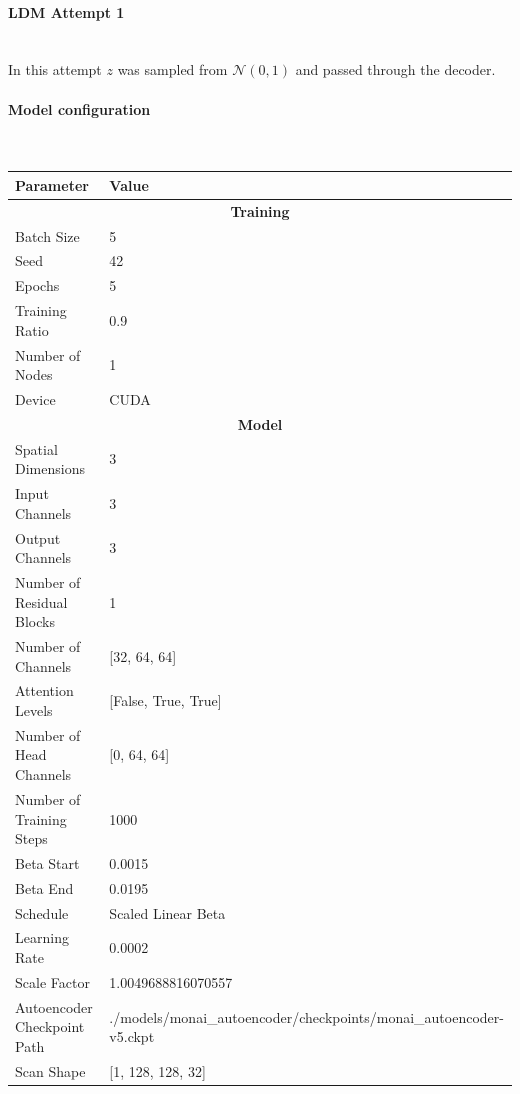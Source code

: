 \paragraph{LDM Attempt 1}\mbox{}\\

In this attempt $z$ was sampled from $\mathcal{N}(0,1)$ and passed through the decoder. 

\paragraph{Model configuration}\mbox{}\\
\begin{table}[H!]
\centering
\begin{tabular}{|l|l|}
\hline
\textbf{Parameter} & \textbf{Value} \\
\hline
\multicolumn{2}{|c|}{\textbf{Training}} \\
\hline
Batch Size & 5 \\
\hline
Seed & 42 \\
\hline
Epochs & 5 \\
\hline
Training Ratio & 0.9 \\
\hline
Number of Nodes & 1 \\
\hline
Device & CUDA \\
\hline
\multicolumn{2}{|c|}{\textbf{Model}} \\
\hline
Spatial Dimensions & 3 \\
\hline
Input Channels & 3 \\
\hline
Output Channels & 3 \\
\hline
Number of Residual Blocks & 1 \\
\hline
Number of Channels & [32, 64, 64] \\
\hline
Attention Levels & [False, True, True] \\
\hline
Number of Head Channels & [0, 64, 64] \\
\hline
Number of Training Steps & 1000 \\
\hline
Beta Start & 0.0015 \\
\hline
Beta End & 0.0195 \\
\hline
Schedule & Scaled Linear Beta \\
\hline
Learning Rate & 0.0002 \\
\hline
Scale Factor & 1.0049688816070557 \\
\hline
Autoencoder Checkpoint Path & ./models/monai_autoencoder/checkpoints/monai_autoencoder-v5.ckpt \\
\hline
Scan Shape & [1, 128, 128, 32] \\

\end{tabular}
\end{table}
